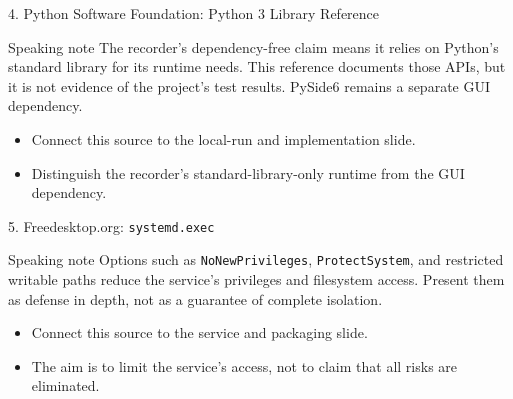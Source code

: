 \documentclass[aspectratio=169,10pt]{beamer}
\begin{document}
\begin{frame}{4. Python Software Foundation: Python 3 Library Reference}
\begin{block}{Speaking note}
The recorder's dependency-free claim means it relies on Python's standard library for its runtime needs. This reference documents those APIs, but it is not evidence of the project's test results. PySide6 remains a separate GUI dependency.
\end{block}
\begin{itemize}
  \item Connect this source to the local-run and implementation slide.
  \item Distinguish the recorder's standard-library-only runtime from the GUI dependency.
\end{itemize}
\end{frame}

\begin{frame}{5. Freedesktop.org: \texttt{systemd.exec}}
\begin{block}{Speaking note}
Options such as \texttt{NoNewPrivileges}, \texttt{ProtectSystem}, and restricted writable paths reduce the service's privileges and filesystem access. Present them as defense in depth, not as a guarantee of complete isolation.
\end{block}
\begin{itemize}
  \item Connect this source to the service and packaging slide.
  \item The aim is to limit the service's access, not to claim that all risks are eliminated.
\end{itemize}
\end{frame}
\end{document}
